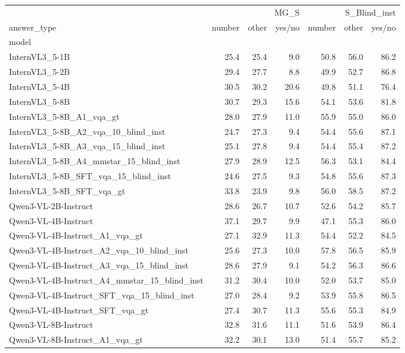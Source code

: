 \begin{tabular}{lrrrrrr}
\toprule
 & \multicolumn{3}{r}{MG_S} & \multicolumn{3}{r}{S_Blind_inst} \\
answer_type & number & other & yes/no & number & other & yes/no \\
model &  &  &  &  &  &  \\
\midrule
InternVL3_5-1B & 25.4 & 25.4 & 9.0 & 50.8 & 56.0 & 86.2 \\
InternVL3_5-2B & 29.4 & 27.7 & 8.8 & 49.9 & 52.7 & 86.8 \\
InternVL3_5-4B & 30.5 & 30.2 & 20.6 & 49.8 & 51.1 & 76.4 \\
InternVL3_5-8B & 30.7 & 29.3 & 15.6 & 54.1 & 53.6 & 81.8 \\
InternVL3_5-8B_A1_vqa_gt & 28.0 & 27.9 & 11.0 & 55.9 & 55.0 & 86.0 \\
InternVL3_5-8B_A2_vqa_10_blind_inst & 24.7 & 27.3 & 9.4 & 54.4 & 55.6 & 87.1 \\
InternVL3_5-8B_A3_vqa_15_blind_inst & 25.1 & 27.8 & 9.4 & 54.4 & 55.4 & 87.2 \\
InternVL3_5-8B_A4_mmstar_15_blind_inst & 27.9 & 28.9 & 12.5 & 56.3 & 53.1 & 84.4 \\
InternVL3_5-8B_SFT_vqa_15_blind_inst & 24.6 & 27.5 & 9.3 & 54.8 & 55.6 & 87.3 \\
InternVL3_5-8B_SFT_vqa_gt & 33.8 & 23.9 & 9.8 & 56.0 & 58.5 & 87.2 \\
Qwen3-VL-2B-Instruct & 28.6 & 26.7 & 10.7 & 52.6 & 54.2 & 85.7 \\
Qwen3-VL-4B-Instruct & 37.1 & 29.7 & 9.9 & 47.1 & 55.3 & 86.0 \\
Qwen3-VL-4B-Instruct_A1_vqa_gt & 27.1 & 32.9 & 11.3 & 54.4 & 52.2 & 84.5 \\
Qwen3-VL-4B-Instruct_A2_vqa_10_blind_inst & 25.6 & 27.3 & 10.0 & 57.8 & 56.5 & 85.9 \\
Qwen3-VL-4B-Instruct_A3_vqa_15_blind_inst & 28.6 & 27.9 & 9.1 & 54.2 & 56.3 & 86.6 \\
Qwen3-VL-4B-Instruct_A4_mmstar_15_blind_inst & 31.2 & 30.4 & 10.0 & 52.0 & 53.7 & 85.0 \\
Qwen3-VL-4B-Instruct_SFT_vqa_15_blind_inst & 27.0 & 28.4 & 9.2 & 53.9 & 55.8 & 86.5 \\
Qwen3-VL-4B-Instruct_SFT_vqa_gt & 27.4 & 30.7 & 11.3 & 55.6 & 55.3 & 84.9 \\
Qwen3-VL-8B-Instruct & 32.8 & 31.6 & 11.1 & 51.6 & 53.9 & 86.4 \\
Qwen3-VL-8B-Instruct_A1_vqa_gt & 32.2 & 30.1 & 13.0 & 51.4 & 55.7 & 85.2 \\

\end{tabular}
